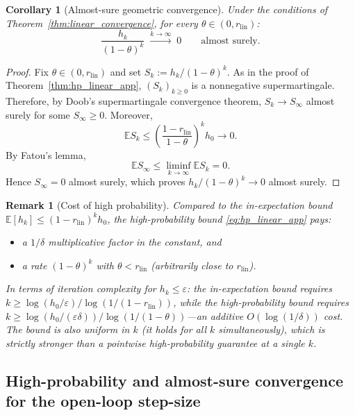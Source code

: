 \documentclass{article}
\newtheorem{corollary}{Corollary}
\newtheorem{remark}{Remark}
\begin{document}
\begin{corollary}[Almost-sure geometric convergence]
\label{cor:as_linear_app}
Under the conditions of Theorem~\ref{thm:linear_convergence},
for every $\theta\in(0,r_{\mathrm{lin}})$:
\[
\frac{h_k}{(1-\theta)^k}\;\xrightarrow{k\to\infty}\;0
\qquad\text{almost surely.}
\]
\end{corollary}
\begin{proof}
Fix \(\theta\in(0,r_{\mathrm{lin}})\) and set
\(S_k:=h_k/(1-\theta)^k\). As in the proof of
Theorem~\ref{thm:hp_linear_app}, \((S_k)_{k\ge0}\) is a nonnegative
supermartingale. Therefore, by Doob's supermartingale convergence theorem,
\(S_k\to S_\infty\) almost surely for some \(S_\infty\ge0\). Moreover,
\[
\mathbb E S_k
\le
\left(\frac{1-r_{\mathrm{lin}}}{1-\theta}\right)^k h_0
\to0.
\]
By Fatou's lemma,
\[
\mathbb E S_\infty\le \liminf_{k\to\infty}\mathbb E S_k=0.
\]
Hence \(S_\infty=0\) almost surely, which proves
\(h_k/(1-\theta)^k\to0\) almost surely.
\end{proof}

\begin{remark}[Cost of high probability]
\label{rem:hp_cost}
Compared to the in-expectation bound
$\mathbb E[h_k]\le(1-r_{\mathrm{lin}})^k h_0$,
the high-probability bound \eqref{eq:hp_linear_app} pays:
\begin{itemize}
\item a $1/\delta$ multiplicative factor in the constant, and
\item a rate $(1-\theta)^k$ with $\theta<r_{\mathrm{lin}}$ (arbitrarily close to $r_{\mathrm{lin}}$).
\end{itemize}
In terms of iteration complexity for $h_k\le\varepsilon$:
the in-expectation bound requires
$k\ge\log(h_0/\varepsilon)/\log(1/(1{-}r_{\mathrm{lin}}))$,
while the high-probability bound requires
$k\ge\log(h_0/(\varepsilon\delta))/\log(1/(1{-}\theta))$---an
additive $O(\log(1/\delta))$ cost.
The bound is also \emph{uniform} in $k$
(it holds for all $k$ simultaneously), which is strictly stronger
than a pointwise high-probability guarantee at a single $k$.
\end{remark}


\subsection{High-probability and almost-sure convergence for the open-loop step-size}
\label{app:high-prob}
\end{document}
